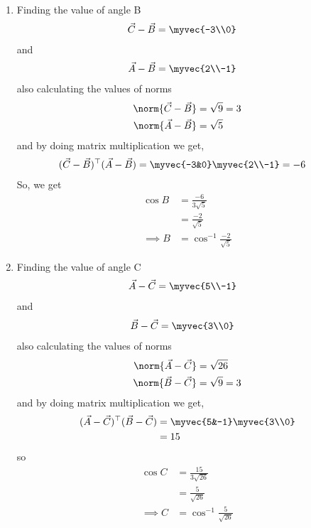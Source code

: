 \documentclass[11pt]{book}
\begin{document}
\begin{enumerate}[label=\thesection.\arabic*.,ref=\thesection.\theenumi]
\begin{enumerate}
\item Finding the value of angle B
\begin{align}
 \vec{C}-\vec{B} &=\myvec{-3\\0}
\end{align}
and 
\begin{align}
 \vec{A}-\vec{B} &= \myvec{2\\-1}
\end{align}
also calculating the values of norms
\begin{align}
 \norm{\vec{C}-\vec{B}} &= \sqrt{9} = 3\\
 \norm{\vec{A}-\vec{B}} &= \sqrt{5}
\end{align}
and by doing matrix multiplication we get,
\begin{align}
\begin{split}
 (\vec{C}-\vec{B})^{\top}(\vec{A}-\vec{B}) &= \myvec{-3&0}\myvec{2\\-1} = -6
\end{split}
\end{align}
So, we get 
\begin{align}
	\cos{B} &= \frac{-6}{{3} \sqrt{5}}\\
 &= \frac{-2}{\sqrt{5}}\\
 \implies B& = \cos^{-1}{\frac{-2}{\sqrt{5}}}
\end{align}

\item Finding the value of angle C
\begin{align}
 \vec{A}-\vec{C} &=\myvec{5\\-1}
\end{align}
and 
\begin{align}
 \vec{B}-\vec{C} &= \myvec{3\\0}
\end{align}
also calculating the values of norms
\begin{align}
 \norm{\vec{A}-\vec{C}} &= \sqrt{26}\\
	\norm{\vec{B}-\vec{C}} &= \sqrt{9} = 3
\end{align}
and by doing matrix multiplication we get,
\begin{align}
\begin{split}
 (\vec{A}-\vec{C})^{\top}(\vec{B}-\vec{C}) &= \myvec{5&-1}\myvec{3\\0}\\
 &= 15
\end{split}
\end{align}
so 
\begin{align}
	\cos{C} &= \frac{15}{{3} \sqrt{26}}\\
 &= \frac{5}{\sqrt{26}}\\
 \implies C &= \cos^{-1}{\frac{5}{\sqrt{26}}}
\end{align}
\end{enumerate}

\latexprintindex

\end{enumerate}
\end{document}
